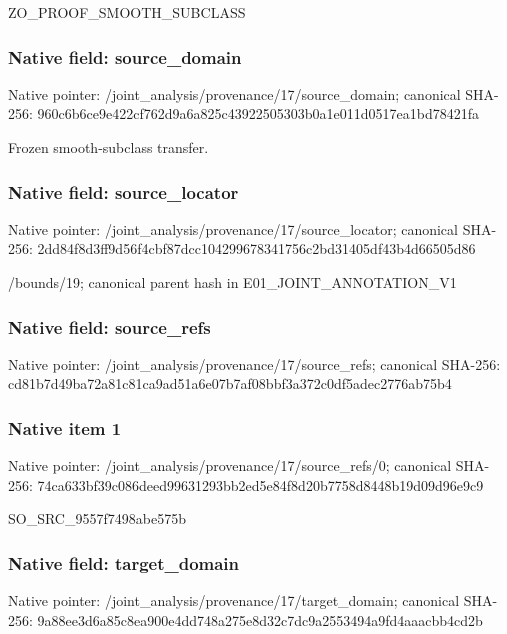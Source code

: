 \documentclass[10pt,a4paper]{article}
\begin{document}
\begingroup\raggedright\sloppy ZO\_\allowbreak{}PROOF\_\allowbreak{}SMOOTH\_\allowbreak{}SUBCLASS\par\endgroup

\subsubsection{Native field: source\_\allowbreak{}domain}
Native pointer: /joint\_\allowbreak{}analysis/provenance/17/source\_\allowbreak{}domain; canonical SHA-256: 960c6b6ce9e422cf762d9a6a825c43922505303b0a1e011d0517ea1bd78421fa

\begingroup\raggedright\sloppy Frozen smooth-subclass transfer.\par\endgroup

\subsubsection{Native field: source\_\allowbreak{}locator}
Native pointer: /joint\_\allowbreak{}analysis/provenance/17/source\_\allowbreak{}locator; canonical SHA-256: 2dd84f8d3ff9d56f4cbf87dcc104299678341756c2bd31405df43b4d66505d86

\begingroup\raggedright\sloppy /\allowbreak{}bounds/\allowbreak{}19;\allowbreak{} canonical parent hash in E01\_\allowbreak{}JOINT\_\allowbreak{}ANNOTATION\_\allowbreak{}V1\par\endgroup

\subsubsection{Native field: source\_\allowbreak{}refs}
Native pointer: /joint\_\allowbreak{}analysis/provenance/17/source\_\allowbreak{}refs; canonical SHA-256: cd81b7d49ba72a81c81ca9ad51a6e07b7af08bbf3a372c0df5adec2776ab75b4

\subsubsection{Native item 1}
Native pointer: /joint\_\allowbreak{}analysis/provenance/17/source\_\allowbreak{}refs/0; canonical SHA-256: 74ca633bf39c086deed99631293bb2ed5e84f8d20b7758d8448b19d09d96e9c9

\begingroup\raggedright\sloppy SO\_\allowbreak{}SRC\_\allowbreak{}9557f7498abe575b\par\endgroup

\subsubsection{Native field: target\_\allowbreak{}domain}
Native pointer: /joint\_\allowbreak{}analysis/provenance/17/target\_\allowbreak{}domain; canonical SHA-256: 9a88ee3d6a85c8ea900e4dd748a275e8d32c7dc9a2553494a9fd4aaacbb4cd2b
\end{document}
